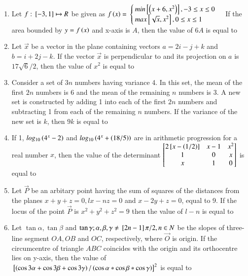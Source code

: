 \documentclass[journal]{IEEEtran}
\begin{document}
\begin{enumerate}
\item Let $f:{}\left[-3,1\right]\mapsto R$ be given as $f\left(x\right)=$ $\begin{cases}
min{}\left[\left(x+6,x^2\right)\right], -3\leq x \leq 0\\
max{}\left[\sqrt{x}, x^2\right], 0\leq x \leq 1
\end{cases}$
If the area bounded by $y=f\left(x\right)$ and x-axis is $A$, then the value of $6A$ is equal to
\item Let $\vec{x}$ be a vector in the plane containing vectors $a=2i-j+k$ and $b=i+2j-k$. If the vector $\vec{x}$ is perpendicular to  and its projection on $a$ is $17\sqrt{6}/2$, then the value of $x^2$ is equal to 
\item Consider a set of $3n$ numbers having variance 4. In this set, the mean of the first $2n$ numbers is 6 and the mean of the remaining $n$ numbers is 3. A new set is constructed by adding 1 into each of the first $2n$ numbers and subtracting 1 from each of the remaining $n$ numbers. If the variance of the new set is $k$, then $9k$ is equal to 
\item If 1, $log_{10}\left(4^x-2\right)$ and $log_{10}\left(4^x+\left(18/5\right)\right)$ are in arithmetic progression for a real number $x$, then the value of the determinant $\begin{bmatrix}2{}\left[x-\left(1/2\right)\right]& x-1 & x^2 \\ 1 & 0 & x \\ x & 1 & 0\end{bmatrix}$ is equal to 
\item Let $\vec{P}$ be an arbitary point having the sum of squares of the distances from the planes $x+y+z=0, lx-nz=0$ and $x-2y+z=0$, equal to 9. If the locus of the point $\vec{P}$ is $x^2+y^2+z^2=9$ then the value of $l-n$ is equal to 
\item Let $\tan \alpha, \tan \beta$ and $\tan \gamma;\alpha,\beta,\gamma\neq{}\left[2n-1\right]\pi/2,n\in N$ be the slopes of three-line segment $OA,OB$ and $OC$, respectively, where $\vec{O}$ is origin. If the circumcentre of triangle $ABC$ coincides with the origin and its orthocentre lies on y-axis, then the value of ${}\left[\left(\cos 3\alpha +\cos 3\beta +\cos 3\gamma\right)/\left(\cos \alpha *\cos \beta *\cos \gamma\right)\right]^2$ is equal to 
\end{enumerate}
\end{document}
